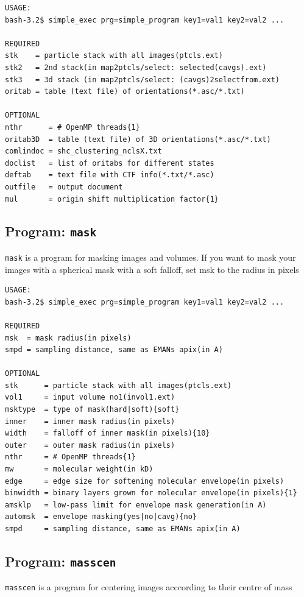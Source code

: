 \documentclass[a4paper,11pt]{article}
\newcommand{\prgname}[1]{\textcolor{NavyBlue}{\texttt{#1}}}
\begin{document}
\begin{verbatim}
USAGE:
bash-3.2$ simple_exec prg=simple_program key1=val1 key2=val2 ...

REQUIRED
stk    = particle stack with all images(ptcls.ext)
stk2   = 2nd stack(in map2ptcls/select: selected(cavgs).ext)
stk3   = 3d stack (in map2ptcls/select: (cavgs)2selectfrom.ext)
oritab = table (text file) of orientations(*.asc/*.txt)

OPTIONAL
nthr      = # OpenMP threads{1}
oritab3D  = table (text file) of 3D orientations(*.asc/*.txt)
comlindoc = shc_clustering_nclsX.txt
doclist   = list of oritabs for different states
deftab    = text file with CTF info(*.txt/*.asc)
outfile   = output document
mul       = origin shift multiplication factor{1}
\end{verbatim}

\subsection{Program: \prgname{mask}}
\label{mask}
\prgname{mask} is a program for masking images and volumes. If you want to mask your images with a spherical mask with a soft falloff, set msk to the radius in pixels

\begin{verbatim}
USAGE:
bash-3.2$ simple_exec prg=simple_program key1=val1 key2=val2 ...

REQUIRED
msk  = mask radius(in pixels)
smpd = sampling distance, same as EMANs apix(in A)

OPTIONAL
stk      = particle stack with all images(ptcls.ext)
vol1     = input volume no1(invol1.ext)
msktype  = type of mask(hard|soft){soft}
inner    = inner mask radius(in pixels)
width    = falloff of inner mask(in pixels){10}
outer    = outer mask radius(in pixels)
nthr     = # OpenMP threads{1}
mw       = molecular weight(in kD)
edge     = edge size for softening molecular envelope(in pixels)
binwidth = binary layers grown for molecular envelope(in pixels){1}
amsklp   = low-pass limit for envelope mask generation(in A)
automsk  = envelope masking(yes|no|cavg){no}
smpd     = sampling distance, same as EMANs apix(in A)
\end{verbatim}

\subsection{Program: \prgname{masscen}}
\label{masscen}
\prgname{masscen} is a program for centering images acccording to their centre of mass
\end{document}
